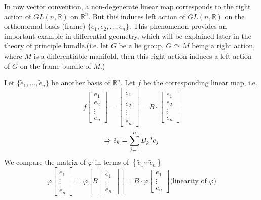 \begin{remark}[Important!]
    In row vector convention, a non-degenerate linear map corresponds to the right action of $GL(n,\mathbb{R})$ on $\mathbb{R}^n$. But this induces left action of $GL(n,\mathbb{R})$ on the orthonormal basis (frame) $\{e_1,e_2,\ldots,e_n\}$. This phenomenon provides an important example in differential geometry, which will be explained later in the theory of principle bundle.(i.e. let $G$ be a lie group, $G\curvearrowright M$ being a right action, where $M$ is a differentiable manifold, then this right action induces a left action of $G$ on the frame bundle of $M$.)
 \end{remark}
 
 
 Let $\{\tilde{e}_1,\ldots,\tilde{e}_n\}$ be another basis of $\mathbb{R}^n$. Let $f$ be the corresponding linear map, i.e.
 \[f\begin{bmatrix}
    e_1\\
    e_2\\
    \vdots\\
    e_n
\end{bmatrix}=\begin{bmatrix}
    \tilde{e}_1\\
    \tilde{e}_2\\
    \vdots\\
    \tilde{e}_n
\end{bmatrix}=B \cdot \begin{bmatrix}
    e_1\\
    e_2\\
    \vdots\\
    e_n
\end{bmatrix}\]
\[\Rightarrow \tilde{e}_k=\sum_{j=1}^n B\indices{_k^j}e_j\]
We compare the matrix of $\varphi$ in terms of $\left\{\tilde{e}_1 \cdots \tilde{e}_n\right\}$
\[
    \varphi\left[\begin{array}{c}\tilde{e}_1 \\ \vdots \\ \tilde{e}_n\end{array}\right]=\varphi\left[B\left[\begin{array}{c}\tilde{e}_1 \\ \vdots \\ e_n\end{array}\right]\right]=B \cdot \varphi\left[\begin{array}{c}e_1 \\ \vdots \\ e_n\end{array}\right]\text{(linearity of }\varphi\text{)}
\]
